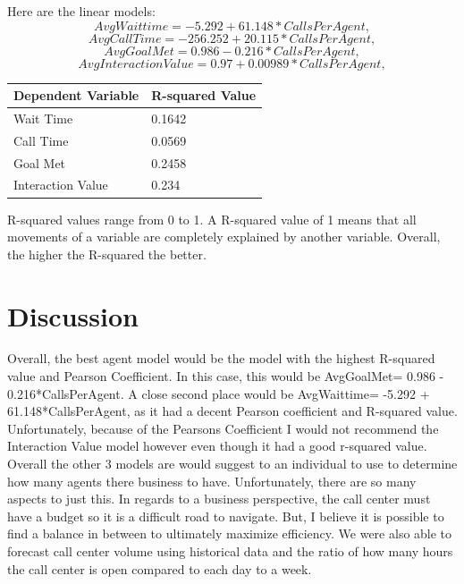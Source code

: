 \documentclass[12pt]{article}
\begin{document}
  Here are the linear models:
  \begin{equation}
    \label{eq:Wait Time}
  AvgWaittime= -5.292 + 61.148*CallsPerAgent,
  \end{equation}
  \begin{equation}
    \label{eq:Call Time}
  AvgCallTime = -256.252 + 20.115*CallsPerAgent,
  \end{equation}
  \begin{equation}
    \label{eq:Goal Met}
  AvgGoalMet= 0.986 - 0.216*CallsPerAgent,
  \end{equation}
  \begin{equation}
    \label{eq:InteractionValue}
  AvgInteractionValue= 0.97 + 0.00989*CallsPerAgent,
  \end{equation}

  \begin{table}[H]
    \resizebox{\textwidth}{!} {
    \begin{tabular}{ l | l |}
      {\bf Dependent Variable} & {\bf R-squared Value}\\
    \hline
    Wait Time& 0.1642 \\
    \hline
    Call Time& 0.0569\\
    \hline
    Goal Met& 0.2458\\
    \hline
    Interaction Value& 0.234\\
    \end{tabular}
    }
    \end{table}
R-squared values range from 0 to 1. A R-squared value of 1 means that all movements of a variable are completely explained by another variable. 
Overall, the higher the R-squared the better.
\section*{Discussion}
Overall, the best agent model would be the model with the highest R-squared value and Pearson Coefficient. In this case, this would be
AvgGoalMet= 0.986 - 0.216*CallsPerAgent. A close second place would be AvgWaittime= -5.292 + 61.148*CallsPerAgent, as it had a decent 
Pearson coefficient and R-squared value. Unfortunately, because of the Pearsons Coefficient I would not recommend the Interaction Value model however even though it had a good 
r-squared value. Overall the other 3 models are would suggest to an individual to use to determine how many agents
there business to have. Unfortunately, there are so many aspects to just this. In regards to a business perspective, the call center must have
a budget so it is a difficult road to navigate. But, I believe it is possible to find a balance in between to ultimately maximize efficiency.
We were also able to forecast call center volume using historical data and the ratio of how many hours the call center is open compared to each day to
a week. 
\end{document}
